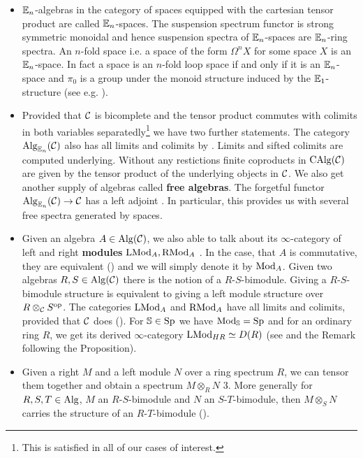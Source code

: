 \begin{itemize}
    \item $\mathbb{E}_n$-algebras in the category of spaces equipped with the cartesian tensor product are called $\mathbb{E}_n$-spaces. The suspension spectrum functor is strong symmetric monoidal and hence suspension spectra of $\mathbb{E}_n$-spaces are $\mathbb{E}_n$-ring spectra. An $n$-fold space i.e. a space of the form $\Omega^n X$ for some space $X$ is an $\mathbb{E}_n$-space. In fact a space is an $n$-fold loop space if and only if it is an $\mathbb{E}_n$-space and $\pi_0$ is a group under the monoid structure induced by the $\mathbb{E}_1$-structure (see e.g. \cite[Section~5.2.6]{lurie2017higher}).
    \item Provided that $\mathcal{C}$ is bicomplete and the tensor product commutes with colimits in both variables separatedly\footnote{This is satisfied in all of our cases of interest.} we have two further statements. The category $\operatorname{Alg}_{\mathbb{E}_n}(\mathcal{C})$ also has all limits and colimits by \cite[Section~3.2]{lurie2017higher}. Limits and sifted colimits are computed underlying. Without any restictions finite coproducts in $\operatorname{CAlg}(\mathcal{C})$ are given by the tensor product of the underlying objects in $\mathcal{C}$. 
    We also get another supply of algebras called \textbf{free algebras}. The forgetful functor $\operatorname{Alg}_{\mathbb{E}_n}(\mathcal{C})\to \mathcal{C}$ has a left adjoint \cite[Corollary~3.1.3.5]{lurie2017higher}. In particular, this provides us with several free spectra generated by spaces. 
    \item Given an algebra $A\in \operatorname{Alg}(\mathcal{C})$, we also able to talk about its $\infty$-category of left and right \textbf{modules }$\operatorname{LMod}_A, \operatorname{RMod}_A$ \cite[Definition~4.2.1.13]{lurie2017higher}. In the case, that $A$ is commutative, they are equivalent (\cite[Section~4.3.2]{lurie2017higher}) and we will simply denote it by $\operatorname{Mod}_A$. Given two algebras $R,S\in \operatorname{Alg}(\mathcal{C})$ there is the notion of a $R$-$S$-bimodule. Giving a $R$-$S$-bimodule structure is equivalent to giving a left module structure over $R\otimes_{\mathcal{C}} S^{\operatorname{op}}$. The categories $\operatorname{LMod}_A$ and $\operatorname{RMod}_A$ have all limits and colimits, provided that $\mathcal{C}$ does (\cite[Section~4.2.3]{lurie2017higher}). For $\mathbb{S}\in\operatorname{Sp}$ we have $\operatorname{Mod}_{\mathbb{S}}=\operatorname{Sp}$ and for an ordinary ring $R$, we get its derived $\infty$-category $\operatorname{LMod}_{HR}\simeq D(R)$ (see \cite[Proposition~7.1.1.15]{lurie2017higher} and the Remark following the Proposition).
    \item Given a right $M$ and a left module $N$ over a ring spectrum $R$, we can tensor them together and obtain a spectrum $M\otimes_R N$ 3. More generally for $R,S,T\in \operatorname{Alg}$, $M$ an $R$-$S$-bimodule and $N$ an $S$-$T$-bimodule, then $M\otimes_S N$ carries the structure of an $R$-$T$-bimodule (\cite[Section~4.4.2]{lurie2017higher}). 

\end{itemize}
